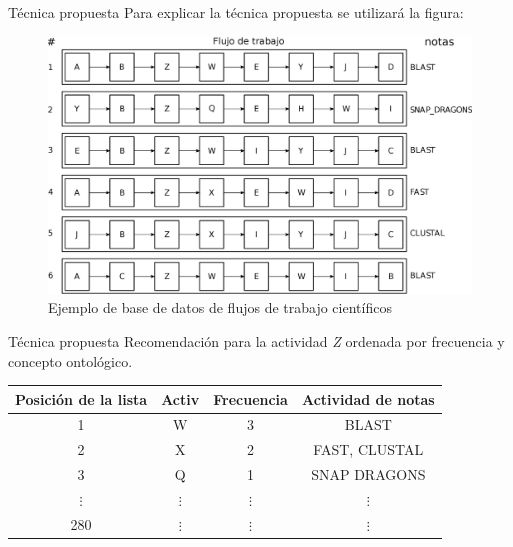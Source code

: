 \begin{frame}		
	\begin{block}{Técnica propuesta}
		Para explicar la técnica propuesta se utilizará la figura:
				\begin{figure}
					\begin{minipage}[b]{0.8\textwidth}
						\includegraphics[width=\textwidth]{./secoes/SolucaoProposta/recomendacaofreqontologia.eps}
						\caption{Ejemplo de base de datos de flujos de trabajo científicos}
					\end{minipage}
				\end{figure}
	\end{block}
\end{frame}


\begin{frame}		
	\begin{block}{Técnica propuesta}
		Recomendación para la actividad \emph{Z} ordenada por frecuencia y concepto ontológico.
		\begin{table}[!htb]
			\centering
			\begin{tabular}{|c|c|c|c|}  \hline
				\textbf{Posición de la lista} & \textbf{Activ} & \textbf{Frecuencia} & \textbf{Actividad de notas} 	\\ \hline
				1				& W 				& 3 				& BLAST				\\ \hline
				2				& X 				& 2 				& FAST, CLUSTAL		\\ \hline
				3				& Q 				& 1 				& SNAP DRAGONS		\\ \hline
				\(\vdots\)		& \(\vdots\)		& \(\vdots\) 		& \(\vdots\)		\\ \hline
				280				& \(\vdots\)		& \(\vdots\)		& \(\vdots\)	\\ \hline
			\end{tabular}
			\label{tabela_lista_recomendacao_ordenada_frequencia}
		\end{table}		
	\end{block}
\end{frame}